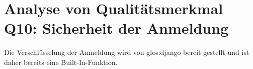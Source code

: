 

\section{Analyse von Qualitätsmerkmal Q10: Sicherheit der Anmeldung}
Die Verschlüsselung der Anmeldung wird von \gls{glos:django} bereit gestellt und ist daher
bereits eine Built-In-Funktion. 
